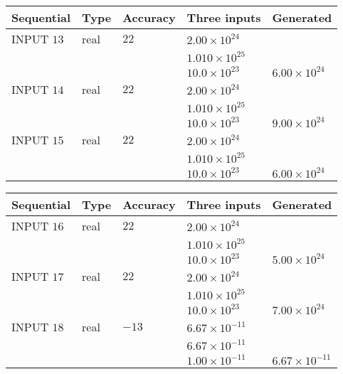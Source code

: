 \documentclass[12pt]{article}
\begin{document}
   
  
  
\noindent\begin{tabular}{|l|l|l|l|l|}
\hline
 Sequential & Type & Accuracy & Three inputs & Generated \\ 
\hline
 
 
  INPUT $          13$ & real & $          22 $ & $
 2.00 \times 10^{24}
  $ & \\
  & & &  $
 1.010 \times 10^{25}
  $ & \\
  & & &  $
 10.0 \times 10^{23}
 $ & $ 6.00 \times 10^{24} $ 
 \\  \hline  
 
 
  INPUT $          14$ & real & $          22 $ & $
 2.00 \times 10^{24}
  $ & \\
  & & &  $
 1.010 \times 10^{25}
  $ & \\
  & & &  $
 10.0 \times 10^{23}
 $ & $ 9.00 \times 10^{24} $ 
 \\  \hline  
 
 
  INPUT $          15$ & real & $          22 $ & $
 2.00 \times 10^{24}
  $ & \\
  & & &  $
 1.010 \times 10^{25}
  $ & \\
  & & &  $
 10.0 \times 10^{23}
 $ & $ 6.00 \times 10^{24} $ 
 \\  \hline  
 \end{tabular}
   
   
  
  
\noindent\begin{tabular}{|l|l|l|l|l|}
\hline
 Sequential & Type & Accuracy & Three inputs & Generated \\ 
\hline
 
 
  INPUT $          16$ & real & $          22 $ & $
 2.00 \times 10^{24}
  $ & \\
  & & &  $
 1.010 \times 10^{25}
  $ & \\
  & & &  $
 10.0 \times 10^{23}
 $ & $ 5.00 \times 10^{24} $ 
 \\  \hline  
 
 
  INPUT $          17$ & real & $          22 $ & $
 2.00 \times 10^{24}
  $ & \\
  & & &  $
 1.010 \times 10^{25}
  $ & \\
  & & &  $
 10.0 \times 10^{23}
 $ & $ 7.00 \times 10^{24} $ 
 \\  \hline  
 
 
  INPUT $          18$ & real & $         -13 $ & $
 6.67 \times 10^{-11}
  $ & \\
  & & &  $
 6.67 \times 10^{-11}
  $ & \\
  & & &  $
 1.00 \times 10^{-11}
 $ & $ 6.67 \times 10^{-11} $ 
 \\  \hline  
 \end{tabular}
   
\end{document}
